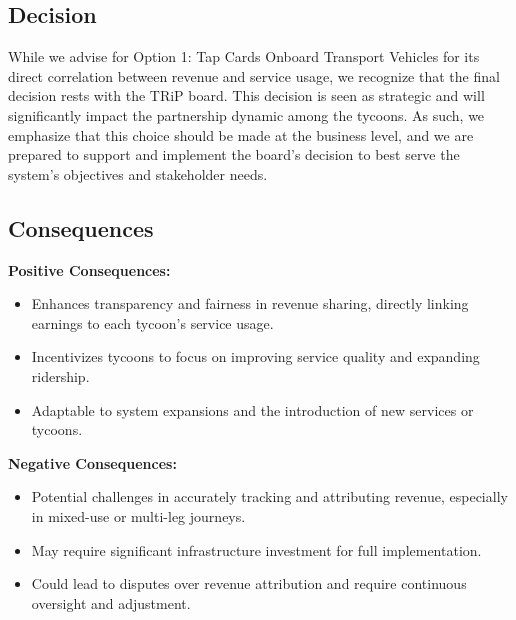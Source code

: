 \subsection*{Decision}
While we advise for Option 1: Tap Cards Onboard Transport Vehicles for its direct correlation between revenue and service usage, we recognize that the final decision rests with the TRiP board. This decision is seen as strategic and will significantly impact the partnership dynamic among the tycoons. As such, we emphasize that this choice should be made at the business level, and we are prepared to support and implement the board's decision to best serve the system's objectives and stakeholder needs.

\subsection*{Consequences}
\textbf{Positive Consequences:}
\begin{itemize}
    \item Enhances transparency and fairness in revenue sharing, directly linking earnings to each tycoon's service usage.
    \item Incentivizes tycoons to focus on improving service quality and expanding ridership.
    \item Adaptable to system expansions and the introduction of new services or tycoons.
\end{itemize}
\textbf{Negative Consequences:}
\begin{itemize}
    \item Potential challenges in accurately tracking and attributing revenue, especially in mixed-use or multi-leg journeys.
    \item May require significant infrastructure investment for full implementation.
    \item Could lead to disputes over revenue attribution and require continuous oversight and adjustment.
\end{itemize}

